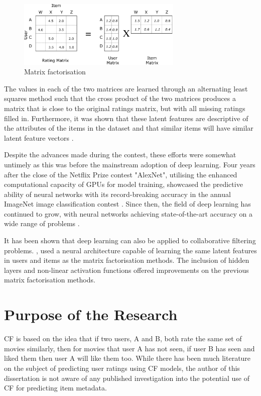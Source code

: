 \begin{figure}[H]
\centering
\includegraphics[width=0.7\textwidth]{Figures/1_matrix-factorisation.png}
\decoRule
\caption[Matrix factorisation]{Matrix factorisation \parencite{liao2018towardsdatascience}}
\label{fig:1_mat-fac}
\end{figure}

The values in each of the two matrices are learned through an alternating least squares method such that the cross product of the two matrices produces a matrix that is close to the original ratings matrix, but with all missing ratings filled in. Furthermore, it was shown that these latent features are descriptive of the attributes of the items in the dataset and that similar items will have similar latent feature vectors \parencite{koren2009matrix}.

Despite the advances made during the contest, these efforts were somewhat untimely as this was before the mainstream adoption of deep learning. Four years after the close of the Netflix Prize contest "AlexNet", utilising the enhanced computational capacity of GPUs for model training, showcased the predictive ability of neural networks with its record-breaking accuracy in the annual ImageNet image classification contest \parencite{krizhevsky2012imagenet}. Since then, the field of deep learning has continued to grow, with neural networks achieving state-of-the-art accuracy on a wide range of problems \parencite{alom2018history}.

It has been shown that deep learning can also be applied to collaborative filtering problems. \cite{he2017neural}, used a neural architecture capable of learning the same latent features in users and items as the matrix factorisation methods. The inclusion of hidden layers and non-linear activation functions offered improvements on the previous matrix factorisation methods.

\section{Purpose of the Research}
CF is based on the idea that if two users, A and B, both rate the same set of movies similarly, then for movies that user A has not seen, if user B has seen and liked them then user A will like them too. While there has been much literature on the subject of predicting user ratings using CF models, the author of this dissertation is not aware of any published investigation into the potential use of CF for predicting item metadata.


